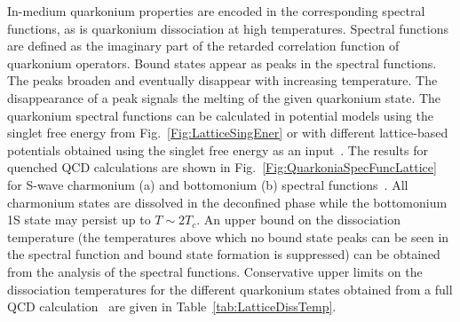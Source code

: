 In-medium quarkonium properties are encoded in the corresponding 
spectral functions, as is quarkonium dissociation
at high temperatures. Spectral functions are defined as
the imaginary part of the retarded correlation function of quarkonium
operators. Bound states appear as peaks in the spectral functions.
The peaks broaden and eventually disappear with
increasing temperature. The disappearance of a peak signals the melting of 
the given quarkonium state.
The quarkonium spectral functions can be calculated in potential models 
using the singlet free energy from Fig.~\ref{Fig:LatticeSingEner} or with different 
lattice-based potentials obtained using the singlet free energy
as an input~\cite{Mocsy:2007yj,Mocsy:2007jz}. 
The results for quenched QCD calculations are shown in Fig.~\ref{Fig:QuarkoniaSpecFuncLattice}
for S-wave charmonium (a) and bottomonium (b) 
spectral functions~\cite{Mocsy:2007yj}.
All charmonium states are dissolved in the deconfined phase while the bottomonium 1S
state may persist up to $T \sim 2T_c$. An upper bound on the dissociation temperature 
(the temperatures above which no
bound state peaks can be seen in the spectral function and bound state 
formation is suppressed) can be obtained from the analysis of the spectral 
functions. Conservative upper limits on the dissociation
temperatures for the different quarkonium states obtained from 
a full QCD calculation~\cite{Mocsy:2007jz} are given in Table~\ref{tab:LatticeDissTemp}.

